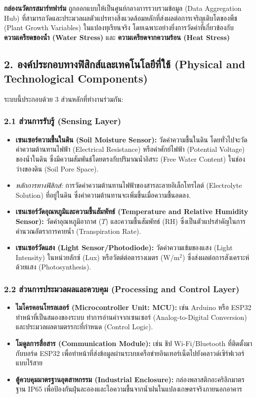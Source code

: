 \documentclass[11pt,a4paper,openany]{report}
\begin{document}
\textbf{กล่องนวัตกรสมาร์ทฟาร์ม} ถูกออกแบบให้เป็นศูนย์กลางการรวบรวมข้อมูล (Data Aggregation Hub) ที่สามารถวัดและประมวลผลตัวแปรทางสิ่งแวดล้อมหลักที่ส่งผลต่อการเจริญเติบโตของพืช (Plant Growth Variables) ในแปลงทุเรียนจริง โดยเฉพาะอย่างยิ่งการวัดค่าที่เกี่ยวข้องกับ \textbf{ความเครียดของน้ำ (Water Stress)} และ \textbf{ความเครียดจากความร้อน (Heat Stress)}

\subsection{2. องค์ประกอบทางฟิสิกส์และเทคโนโลยีที่ใช้ (Physical and Technological Components)}


ระบบนี้ประกอบด้วย 3 ส่วนหลักที่ทำงานร่วมกัน:

\subsubsection{2.1 ส่วนการรับรู้ (Sensing Layer)}

\begin{itemize}
  \item \textbf{เซนเซอร์ความชื้นในดิน (Soil Moisture Sensor):} วัดค่าความชื้นในดิน โดยทั่วไปจะวัดค่าความต้านทานไฟฟ้า (Electrical Resistance) หรือค่าศักย์ไฟฟ้า (Potential Voltage) ของน้ำในดิน ซึ่งมีความสัมพันธ์โดยตรงกับปริมาณน้ำอิสระ (Free Water Content) ในช่องว่างของดิน (Soil Pore Space).
  \item \textit{หลักการทางฟิสิกส์:} การวัดค่าความต้านทานไฟฟ้าของสารละลายอิเล็กโทรไลต์ (Electrolyte Solution) ที่อยู่ในดิน ซึ่งค่าความต้านทานจะเพิ่มขึ้นเมื่อความชื้นลดลง.
  \item \textbf{เซนเซอร์วัดอุณหภูมิและความชื้นสัมพัทธ์ (Temperature and Relative Humidity Sensor):} วัดค่าอุณหภูมิอากาศ ($T$) และความชื้นสัมพัทธ์ ($\text{RH}$) ซึ่งเป็นตัวแปรสำคัญในการคำนวณอัตราการคายน้ำ (Transpiration Rate).
  \item \textbf{เซนเซอร์วัดแสง (Light Sensor/Photodiode):} วัดค่าความเข้มของแสง (Light Intensity) ในหน่วยลักซ์ (Lux) หรือวัตต์ต่อตารางเมตร (W/m$^2$) ซึ่งส่งผลต่อการสังเคราะห์ด้วยแสง (Photosynthesis).
\end{itemize}


\subsubsection{2.2 ส่วนการประมวลผลและควบคุม (Processing and Control Layer)}

\begin{itemize}
  \item \textbf{ไมโครคอนโทรลเลอร์ (Microcontroller Unit: MCU):} เช่น Arduino หรือ ESP32 ทำหน้าที่เป็นสมองของระบบ ทำการอ่านค่าจากเซนเซอร์ (Analog-to-Digital Conversion) และประมวลผลตามตรรกะที่กำหนด (Control Logic).
  \item \textbf{โมดูลการสื่อสาร (Communication Module):} เช่น ชิป Wi-Fi/Bluetooth ที่ติดตั้งมากับบอร์ด ESP32 เพื่อทำหน้าที่ส่งข้อมูลผ่านระบบเครือข่ายอินเทอร์เน็ตไปยังคลาวด์เซิร์ฟเวอร์แบบไร้สาย
  \item \textbf{ตู้ควบคุมมาตรฐานอุตสาหกรรม (Industrial Enclosure):} กล่องพลาสติกอะคริลิกมาตรฐาน IP65 เพื่อป้องกันฝุ่นละอองและไอความชื้นจากน้ำฝนในแปลงเกษตรจริงภายนอกอาคาร
\end{itemize}
\end{document}
